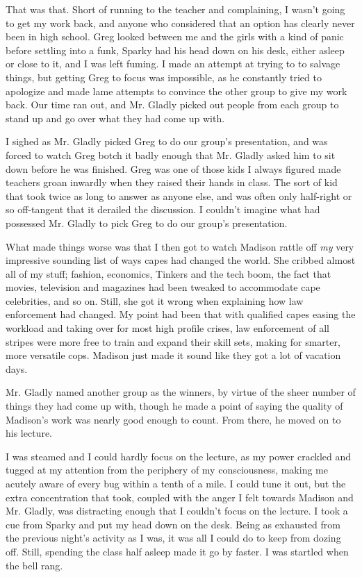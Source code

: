 That was that. Short of running to the teacher and complaining, I wasn't going to get my work back, and anyone who considered that an option has clearly never been in high school. Greg looked between me and the girls with a kind of panic before settling into a funk, Sparky had his head down on his desk, either asleep or close to it, and I was left fuming. I made an attempt at trying to to salvage things, but getting Greg to focus was impossible, as he constantly tried to apologize and made lame attempts to convince the other group to give my work back. Our time ran out, and Mr. Gladly picked out people from each group to stand up and go over what they had come up with.

I sighed as Mr. Gladly picked Greg to do our group's presentation, and was forced to watch Greg botch it badly enough that Mr. Gladly asked him to sit down before he was finished. Greg was one of those kids I always figured made teachers groan inwardly when they raised their hands in class. The sort of kid that took twice as long to answer as anyone else, and was often only half-right or so off-tangent that it derailed the discussion. I couldn't imagine what had possessed Mr. Gladly to pick Greg to do our group's presentation.

What made things worse was that I then got to watch Madison rattle off {\em my} very impressive sounding list of ways capes had changed the world. She cribbed almost all of my stuff; fashion, economics, Tinkers and the tech boom, the fact that movies, television and magazines had been tweaked to accommodate cape celebrities, and so on. Still, she got it wrong when explaining how law enforcement had changed. My point had been that with qualified capes easing the workload and taking over for most high profile crises, law enforcement of all stripes were more free to train and expand their skill sets, making for smarter, more versatile cops. Madison just made it sound like they got a lot of vacation days.

Mr. Gladly named another group as the winners, by virtue of the sheer number of things they had come up with, though he made a point of saying the quality of Madison's work was nearly good enough to count. From there, he moved on to his lecture.

I was steamed and I could hardly focus on the lecture, as my power crackled and tugged at my attention from the periphery of my consciousness, making me acutely aware of every bug within a tenth of a mile. I could tune it out, but the extra concentration that took, coupled with the anger I felt towards Madison and Mr. Gladly, was distracting enough that I couldn't focus on the lecture. I took a cue from Sparky and put my head down on the desk. Being as exhausted from the previous night's activity as I was, it was all I could do to keep from dozing off. Still, spending the class half asleep made it go by faster. I was startled when the bell rang.

